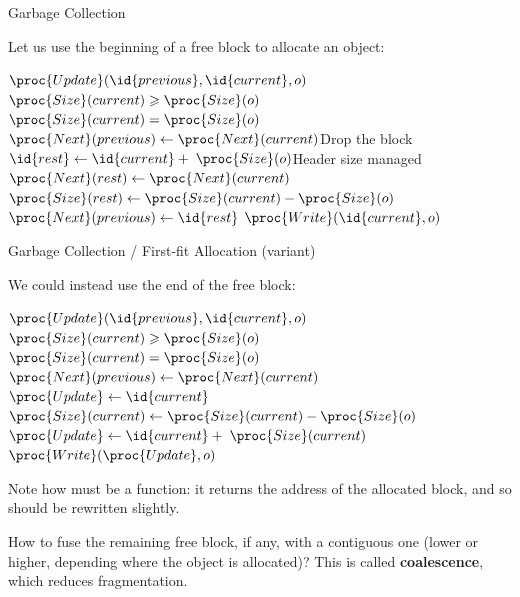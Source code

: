\documentclass[compress,dvipdfmx]{beamer}
\begin{document}
%
\begin{frame}{Garbage Collection}

  Let us use the beginning of a free block to allocate an object:
  \begin{codebox}
    \(\proc{Update}(\id{previous}, \id{current}, o)\)\RComment
    \(\proc{Size}(current) \geqslant \proc{Size}(o)\)\\
    \li \If \(\proc{Size}(current) = \proc{Size}(o)\)
    \li \Then \(\proc{Next}(previous) \gets
    \proc{Next}(current)\)\RComment Drop the block
    \li \Else \(\id{rest} \gets \id{current} + \;
    \proc{Size}(o)\)\RComment Header size managed
    \li       \(\proc{Next}(rest) \gets \proc{Next}(current)\)
    \li       \(\proc{Size}(rest) \gets \proc{Size}(current) - \proc{Size}(o)\)
    \li       \(\proc{Next}(previous) \gets \id{rest}\)
        \End
    \li \(\proc{Write}(\id{current}, o)\)
  \end{codebox}

\end{frame}

%
\begin{frame}{Garbage Collection / First-fit Allocation (variant)}

  We could instead use the end of the free block:
  \begin{codebox}
    \(\proc{Update}(\id{previous}, \id{current}, o)\)\RComment
    \(\proc{Size}(current) \geqslant \proc{Size}(o)\)\\
    \li \If \(\proc{Size}(current) = \proc{Size}(o)\)
    \li \Then \(\proc{Next}(previous) \gets \proc{Next}(current)\)
    \li       \(\proc{Update} \gets \id{current}\)
    \li \Else \(\proc{Size}(current) \gets \proc{Size}(current) - \proc{Size}(o)\)
    \li       \(\proc{Update} \gets \id{current} + \; \proc{Size}(current)\)
        \End
    \li \(\proc{Write}(\proc{Update}, o)\)
  \end{codebox}
  Note how  must be a function: it returns the address of
  the allocated block, and so  should be rewritten
  slightly.

  \bigskip

  How to fuse the remaining free block, if any, with a contiguous one
  (lower or higher, depending where the object is allocated)? This is
  called \textbf{coalescence}, which reduces fragmentation.

\end{frame}
\end{document}

